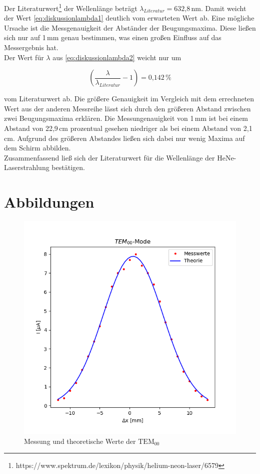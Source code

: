 Der Literaturwert\footnote{https://www.spektrum.de/lexikon/physik/helium-neon-laser/6579} der Wellenlänge beträgt $\lambda_{Literatur} = \text{632,8}$\,nm. Damit weicht der Wert \ref{eq:diskussionlambda1} deutlich vom erwarteten Wert ab. Eine mögliche Ursache ist die Messgenauigkeit der Abständer der Beugungsmaxima. Diese ließen sich nur auf 1\,mm genau bestimmen, was einen großen Einfluss auf das Messergebnis hat.\\
Der Wert für $\lambda$ aus \ref{eq:diskussionlambda2} weicht nur um 

\begin{equation}
(\frac{\lambda}{\lambda_{Literatur}}-1)= \text{0,142}\,\%
\end{equation}

vom Literaturwert ab. Die größere Genauigkeit im Vergleich mit dem errechneten Wert aus der anderen Messreihe lässt sich durch den größeren Abstand zwischen zwei Beugungsmaxima erklären. Die Messungenauigkeit von 1\,mm ist bei einem Abstand von 22,9\,cm prozentual gesehen niedriger als bei einem Abstand von 2,1\,cm. Aufgrund des größeren Abstandes ließen sich dabei nur wenig Maxima auf dem Schirm abbilden.\\
Zusammenfassend ließ sich der Literaturwert für die Wellenlänge der HeNe-Laserstrahlung bestätigen.



\clearpage



\section{Abbildungen}




\begin{figure}
\includegraphics{figures/TEM_00.png}
\caption{Messung und theoretische Werte der $\text{TEM}_{00}$}
\label{fig:TEM_00}
\end{figure}


